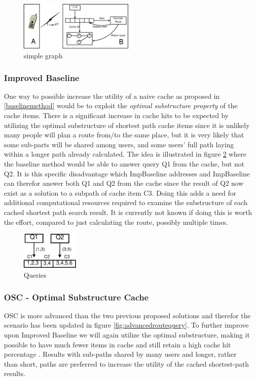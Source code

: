 \begin{figure}
  \center
	\includegraphics[width=0.5\textwidth]{figures/simpleroutequery.pdf}
	\caption{simple graph}
  \label{fig:simpleroutequery}
\end{figure}

\subsubsection{Improved Baseline}\label{baselinemethodimp}
One way to possible increase the utility of a naive cache as proposed in \ref{baselinemethod} would be to exploit the \textit{optimal substructure property}\cite{introalg} of the cache items.
There is a significant increase in cache hits to be expected by utilizing the optimal substructure of shortest path cache items since it is unlikely many people will plan a route from/to the same place, but it is very likely that some sub-parts will be shared among users, and some users' full path laying within a longer path already calculated. The idea is illustrated in figure \ref{fig:cacheQueries} where the baseline method would be able to answer query Q1 from the cache, but not Q2. It is this specific disadvantage which ImpBaseline addresses and ImpBaseline can therefor answer both Q1 and Q2 from the cache since the result of Q2 now exist as a solution to a subpath of cache item C3.
Doing this adds a need for additional computational resources  required to examine the substructure of each  cached shortest path search result. It is currently not known if doing this is worth the effort, compared to just calculating the route, possibly multiple times.

\begin{figure}
  \center
	\includegraphics[width=0.25\textwidth]{figures/cacheQueries.pdf}
	\caption{Queries}
  \label{fig:cacheQueries}
\end{figure}

\subsubsection{OSC - Optimal Substructure Cache}
OSC is more advanced than the two previous proposed solutions and therefor the scenario has been updated in figure \ref{fig:advancedroutequery}. 
To further improve upon Improved Baseline we will again utilize the optimal substructure, making it possible to have much fewer items in cache and still retain a high cache hit percentage \cite{ref}. %
Results with sub-paths shared by many users and longer, rather than short, paths are preferred to increase the utility of the cached shortest-path results.

